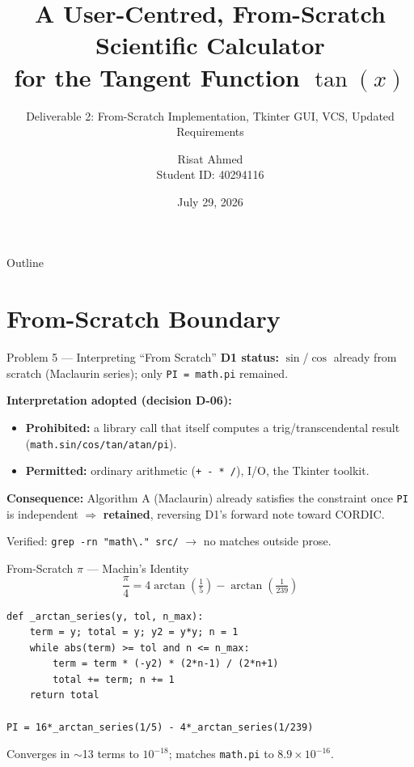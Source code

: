 \documentclass[10pt]{beamer}
\title[F2 $\tan(x)$ -- D2]{A User-Centred, From-Scratch Scientific Calculator\\ for the Tangent Function $\tan(x)$}
\subtitle{Deliverable 2: From-Scratch Implementation, Tkinter GUI, VCS, Updated Requirements}
\author{Risat Ahmed \\ \small Student ID: 40294116}
\institute{SOEN 6011 -- Software Engineering Processes, Section CC \\ Concordia University -- Summer 2026}
\date{July 29, 2026}
\begin{document}
\begin{frame}
  \titlepage
\end{frame}

\begin{frame}{Outline}
  \tableofcontents
\end{frame}

\section{From-Scratch Boundary}
\begin{frame}{Problem 5 --- Interpreting ``From Scratch''}
  \textbf{D1 status:} $\sin$/$\cos$ already from scratch (Maclaurin series); only \texttt{PI = math.pi} remained.

  \vspace{0.3cm}
  \textbf{Interpretation adopted (decision D-06):}
  \begin{itemize}
    \item \textbf{Prohibited:} a library call that itself computes a trig/transcendental result (\texttt{math.sin/cos/tan/atan/pi}).
    \item \textbf{Permitted:} ordinary arithmetic (\texttt{+ - * /}), I/O, the Tkinter toolkit.
  \end{itemize}

  \vspace{0.3cm}
  \textbf{Consequence:} Algorithm A (Maclaurin) already satisfies the constraint once \texttt{PI} is independent $\Rightarrow$ \textbf{retained}, reversing D1's forward note toward CORDIC.

  \vspace{0.2cm}
  Verified: \texttt{grep -rn "math\textbackslash." src/} $\to$ no matches outside prose.
\end{frame}

\begin{frame}[fragile]{From-Scratch $\pi$ --- Machin's Identity}
  \[
  \frac{\pi}{4} = 4\arctan\!\left(\tfrac{1}{5}\right) - \arctan\!\left(\tfrac{1}{239}\right)
  \]
  \begin{lstlisting}[style=code]
def _arctan_series(y, tol, n_max):
    term = y; total = y; y2 = y*y; n = 1
    while abs(term) >= tol and n <= n_max:
        term = term * (-y2) * (2*n-1) / (2*n+1)
        total += term; n += 1
    return total

PI = 16*_arctan_series(1/5) - 4*_arctan_series(1/239)
  \end{lstlisting}
  Converges in $\sim$13 terms to $10^{-18}$; matches \texttt{math.pi} to $8.9\times10^{-16}$.
\end{frame}
\end{document}
